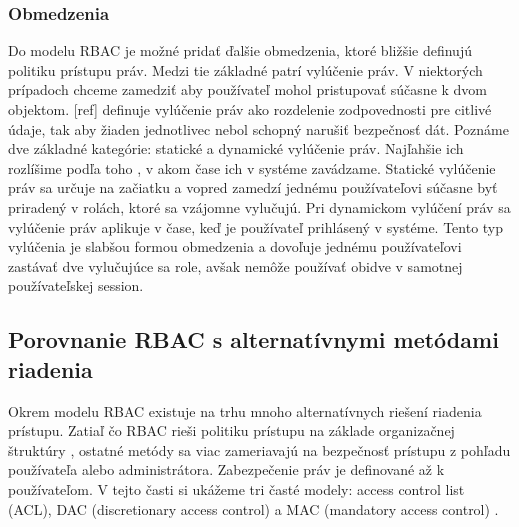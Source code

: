\subsubsection{Obmedzenia}
Do modelu RBAC je možné pridať ďalšie obmedzenia, ktoré bližšie definujú politiku prístupu práv. Medzi tie základné patrí vylúčenie práv. V niektorých prípadoch chceme zamedziť aby používateľ mohol pristupovať súčasne k dvom objektom. [ref] definuje vylúčenie práv ako rozdelenie zodpovednosti pre citlivé údaje, tak aby žiaden jednotlivec nebol schopný narušiť bezpečnosť dát. Poznáme dve základné kategórie: statické a dynamické vylúčenie práv. Najľahšie ich rozlíšime podľa toho , v akom čase ich v systéme zavádzame. Statické vylúčenie práv sa určuje na začiatku a vopred zamedzí jednému používateľovi súčasne byť priradený v rolách, ktoré sa vzájomne vylučujú. Pri dynamickom vylúčení práv sa vylúčenie práv aplikuje v čase, keď je používateľ prihlásený v systéme. Tento typ vylúčenia je slabšou formou obmedzenia a dovoľuje jednému používateľovi zastávať dve vylučujúce sa role, avšak nemôže používať obidve v samotnej používateľskej session.



\subsection{Porovnanie RBAC s alternatívnymi metódami riadenia}
Okrem modelu RBAC existuje na trhu mnoho alternatívnych riešení riadenia prístupu. Zatiaľ čo RBAC rieši politiku prístupu na základe organizačnej štruktúry , ostatné metódy sa viac zameriavajú na bezpečnosť prístupu z pohľadu používateľa alebo administrátora. Zabezpečenie práv je definované až k používateľom.
V tejto časti si ukážeme tri časté modely: access control list (ACL), DAC (discretionary access control) a MAC (mandatory access control) .

